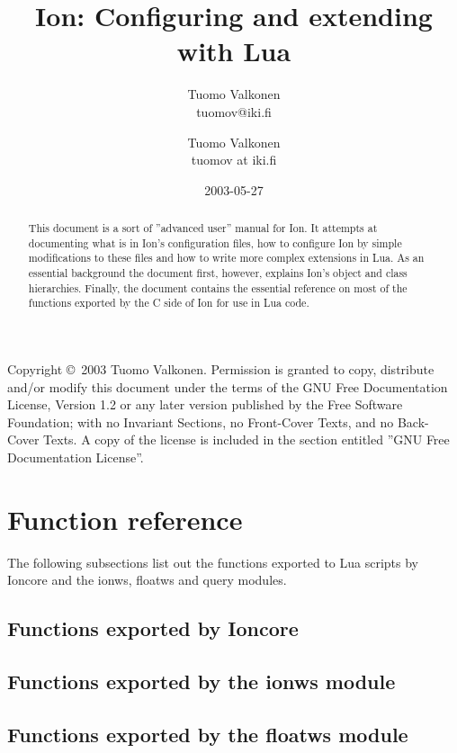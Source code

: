 \documentclass[english,a4paper,11pt,oldtoc,mctitle]{rapport3}
\title{Ion: Configuring and extending with Lua}
\author{Tuomo Valkonen \\ tuomov@iki.fi}
\author{Tuomo Valkonen \\ tuomov at iki.fi}
\date{2003-05-27}
\begin{document}
\maketitle

Copyright \copyright\  2003 Tuomo Valkonen.
Permission is granted to copy, distribute and/or modify this document
under the terms of the GNU Free Documentation License, Version 1.2
or any later version published by the Free Software Foundation;
with no Invariant Sections, no Front-Cover Texts, and no Back-Cover Texts.
A copy of the license is included in the section entitled ''GNU
Free Documentation License''.

\begin{abstract}
    This document is a sort of ''advanced user'' manual for Ion. It
    attempts at documenting what is in Ion's configuration files,
    how to configure Ion by simple modifications to these files and
    how to write more complex extensions in Lua. As an essential 
    background the document first, however, explains Ion's object and
    class hierarchies. Finally, the document contains the essential
    reference on most of the functions exported by the C side of Ion
    for use in Lua code.
\end{abstract}

\tableofcontents





\chapter{Function reference}
\label{sec:exports}

The following subsections list out the functions exported to Lua scripts
by Ioncore and the ionws, floatws and query modules.

\section{Functions exported by Ioncore}
\label{sec:ioncoreref}



\section{Functions exported by the ionws module}
\label{sec:ionwsref}



\section{Functions exported by the floatws module}
\label{sec:floatwsref}
\end{document}
